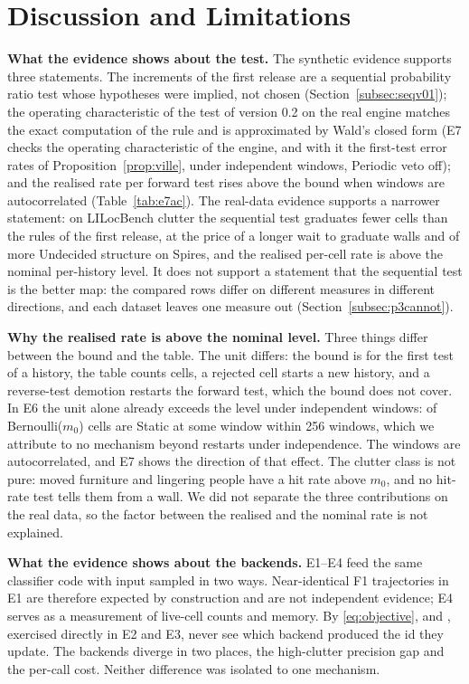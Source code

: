 \section{Discussion and Limitations}\label{sec:disc}

\noindent\textbf{What the evidence shows about the test.} The synthetic evidence supports three statements. The increments of the first release are a sequential probability ratio test whose hypotheses were implied, not chosen (Section~\ref{subsec:seqv01}); the operating characteristic of the test of version 0.2 on the real engine matches the exact computation of the rule and is approximated by Wald's closed form (E7 checks the operating characteristic of the engine, and with it the first-test error rates of Proposition~\ref{prop:ville}, under independent windows, Periodic veto off); and the realised rate per forward test rises above the bound when windows are autocorrelated (Table~\ref{tab:e7ac}). The real-data evidence supports a narrower statement: on LILocBench clutter the sequential test graduates fewer cells than the rules of the first release, at the price of a longer wait to graduate walls and of more Undecided structure on Spires, and the realised per-cell rate is above the nominal per-history level. It does not support a statement that the sequential test is the better map: the compared rows differ on different measures in different directions, and each dataset leaves one measure out (Section~\ref{subsec:p3cannot}).

\noindent\textbf{Why the realised rate is above the nominal level.} Three things differ between the bound and the table. The unit differs: the bound is for the first test of a history, the table counts cells, a rejected cell starts a new history, and a reverse-test demotion restarts the forward test, which the bound does not cover. In E6 the unit alone already exceeds the level under independent windows: \SqEsixEverTw{} of \SqCellsAperiodic{} Bernoulli($m_0$) cells are Static at some window within 256 windows, which we attribute to no mechanism beyond restarts under independence. The windows are autocorrelated, and E7 shows the direction of that effect. The clutter class is not pure: moved furniture and lingering people have a hit rate above $m_0$, and no hit-rate test tells them from a wall. We did not separate the three contributions on the real data, so the factor between the realised and the nominal rate is not explained.

\noindent\textbf{What the evidence shows about the backends.} E1--E4 feed the same classifier code with input sampled in two ways. Near-identical F1 trajectories in E1 are therefore expected by construction and are not independent evidence; E4 serves as a measurement of live-cell counts and memory. By \eqref{eq:objective},  and , exercised directly in E2 and E3, never see which backend produced the id they update. The backends diverge in two places, the high-clutter precision gap and the per-call cost. Neither difference was isolated to one mechanism.

